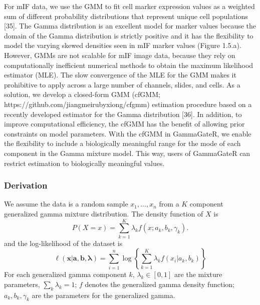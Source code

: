 \documentclass[
  letterpaper,
  DIV=11,
  numbers=noendperiod,
  oneside]{scrreprt}
\begin{document}
For mIF data, we use the GMM to fit cell marker expression values as a
weighted sum of different probability distributions that represent
unique cell populations {[}35{]}. The Gamma distribution is an excellent
model for marker values because the domain of the Gamma distribution is
strictly positive and it has the flexibility to model the varying skewed
densities seen in mIF marker values (Figure 1.5.a). However, GMMs are
not scalable for mIF image data, because they rely on computationally
inefficient numerical methods to obtain the maximum likelihood estimator
(MLE). The slow convergence of the MLE for the GMM makes it prohibitive
to apply across a large number of channels, slides, and cells. As a
solution, we develop a closed-form GMM (cfGMM;
https://github.com/jiangmeirubyxiong/cfgmm) estimation procedure based
on a recently developed estimator for the Gamma distribution {[}36{]}.
In addition, to improve computational efficiency, the cfGMM has the
benefit of allowing prior constraints on model parameters. With the
cfGMM in GammaGateR, we enable the flexibility to include a biologically
meaningful range for the mode of each component in the Gamma mixture
model. This way, users of GammaGateR can restrict estimation to
biologically meaningful values.

\hypertarget{derivation}{%
\subsubsection{Derivation}\label{derivation}}

We assume the data is a random sample \(x_1, \ldots, x_n\) from a \(K\)
component generalized gamma mixture distribution. The density function
of \(X\) is \begin{equation*}
P(X=x)=\sum_{k=1}^K \lambda_k f(x; a_k, b_k, \gamma_k).
\end{equation*} and the log-likelihood of the dataset is
\begin{equation}
    \ell(\mathbf{x}|\mathbf{a},\mathbf{b},\pmb{\lambda})=\sum^n_{i=1}\log\left\{\sum^K_{k=1}\lambda_kf(x_i|a_k,b_k)\right\}
    \label{eq:loglikelihood}
\end{equation} For each generalized gamma component \(k\),
\(\lambda_k\in [0,1]\) are the mixture parameters,
\(\sum_{k} \lambda_k = 1\); \(f\) denotes the generalized gamma density
function; \(a_k, b_k, \gamma_k\) are the parameters for the generalized
gamma.
\end{document}
